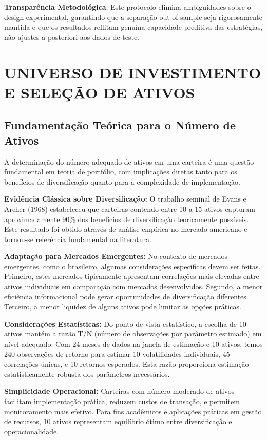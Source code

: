 \textbf{Transparência Metodológica}: Este protocolo elimina ambiguidades sobre o design experimental, garantindo que a separação out-of-sample seja rigorosamente mantida e que os resultados reflitam genuína capacidade preditiva das estratégias, não ajustes a posteriori aos dados de teste.

\section{UNIVERSO DE INVESTIMENTO E SELEÇÃO DE ATIVOS}

\subsection{Fundamentação Teórica para o Número de Ativos}

A determinação do número adequado de ativos em uma carteira é uma questão fundamental em teoria de portfólio, com implicações diretas tanto para os benefícios de diversificação quanto para a complexidade de implementação.

\textbf{Evidência Clássica sobre Diversificação:} O trabalho seminal de Evans e Archer (1968) estabeleceu que carteiras contendo entre 10 a 15 ativos capturam aproximadamente 90\% dos benefícios de diversificação teoricamente possíveis. Este resultado foi obtido através de análise empírica no mercado americano e tornou-se referência fundamental na literatura.

\textbf{Adaptação para Mercados Emergentes:} No contexto de mercados emergentes, como o brasileiro, algumas considerações específicas devem ser feitas. Primeiro, estes mercados tipicamente apresentam correlações mais elevadas entre ativos individuais em comparação com mercados desenvolvidos. Segundo, a menor eficiência informacional pode gerar oportunidades de diversificação diferentes. Terceiro, a menor liquidez de alguns ativos pode limitar as opções práticas.

\textbf{Considerações Estatísticas:} Do ponto de vista estatístico, a escolha de 10 ativos mantém a razão T/N (número de observações por parâmetro estimado) em nível adequado. Com 24 meses de dados na janela de estimação e 10 ativos, temos 240 observações de retorno para estimar 10 volatilidades individuais, 45 correlações únicas, e 10 retornos esperados. Esta razão proporciona estimação estatisticamente robusta dos parâmetros necessários.

\textbf{Simplicidade Operacional:} Carteiras com número moderado de ativos facilitam implementação prática, reduzem custos de transação, e permitem monitoramento mais efetivo. Para fins acadêmicos e aplicações práticas em gestão de recursos, 10 ativos representam equilíbrio ótimo entre diversificação e operacionalidade.

